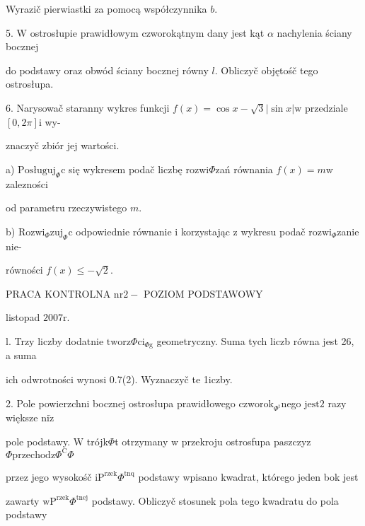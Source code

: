 \documentclass[a4paper,12pt]{article}
\begin{document}
Wyrazič pierwiastki za pomocą współczynnika $b.$

5. $\mathrm{W}$ ostrosłupie prawidłowym czworokątnym dany jest kąt $\alpha$ nachylenia ściany bocznej

do podstawy oraz obwód ściany bocznej równy $l$. Obliczyč objętośč tego ostrosłupa.

6. Narysowač staranny wykres funkcji $f(x)=\cos x-\sqrt{3}|\sin x| \mathrm{w}$ przedziale $[0,2\pi] \mathrm{i}$ wy-

znaczyč zbiór jej wartości.

a) $\mathrm{P}\mathrm{o}\mathrm{s}\text{ł} \mathrm{u}\mathrm{g}\mathrm{u}\mathrm{j}_{\Phi}\mathrm{c}$ się wykresem podač liczbę rozwi$\Phi$zań równania $f(x)=m\mathrm{w}$ zalezności

od parametru rzeczywistego $m.$

b) $\mathrm{R}\mathrm{o}\mathrm{z}\mathrm{w}\mathrm{i}_{\Phi}\mathrm{z}\mathrm{u}\mathrm{j}_{\Phi}\mathrm{c}$ odpowiednie równanie $\mathrm{i}$ korzystając $\mathrm{z}$ wykresu podač $\mathrm{r}\mathrm{o}\mathrm{z}\mathrm{w}\mathrm{i}_{\Phi}$zanie nie-

równości $f(x)\leq-\sqrt{2}.$





PRACA KONTROLNA $\mathrm{n}\mathrm{r}2-$ POZIOM PODSTAWOWY

listopad $2007\mathrm{r}.$

l. Trzy liczby dodatnie $\mathrm{t}\mathrm{w}\mathrm{o}\mathrm{r}\mathrm{z}\Phi \mathrm{c}\mathrm{i}_{\Phi \mathrm{g}}$ geometryczny. Suma tych liczb równa jest 26, a suma

ich odwrotności wynosi 0.7(2). Wyznaczyč te 1iczby.

2. Pole powierzchni bocznej ostrosłupa prawidłowego $\mathrm{c}\mathrm{z}\mathrm{w}\mathrm{o}\mathrm{r}\mathrm{o}\mathrm{k}_{\Phi^{\mathrm{t}}}$nego j$\mathrm{e}\mathrm{s}\mathrm{t}2$ razy większe $\mathrm{n}\mathrm{i}\dot{\mathrm{z}}$

pole podstawy. $\mathrm{W}$ trójk$\Phi$t otrzymany $\mathrm{w}$ przekroju ostrosfupa $\mathrm{p}\mathrm{a}$szczyz $\Phi \mathrm{p}\mathrm{r}\mathrm{z}\mathrm{e}\mathrm{c}\mathrm{h}\mathrm{o}\mathrm{d}\mathrm{z}\Phi^{\mathrm{C}}\Phi$

przez jego wysokośč $\mathrm{i} \mathrm{P}^{\mathrm{r}\mathrm{z}\mathrm{e}\mathrm{k}}\Phi^{\mathrm{t}\mathrm{n}\mathrm{q}}$ podstawy wpisano kwadrat, którego jeden bok jest

zawarty $\mathrm{w}\mathrm{P}^{\mathrm{r}\mathrm{z}\mathrm{e}\mathrm{k}}\Phi^{\mathrm{t}\mathrm{n}\mathrm{e}\mathrm{j}}$ podstawy. Obliczyč stosunek pola tego kwadratu do pola podstawy
\end{document}
